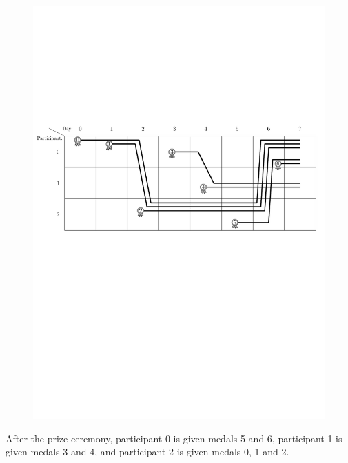 \begin{figure}
\begin{center}
  \includegraphics{sample_illustration}
\end{center}
\end{figure}

After the prize ceremony, participant 0 is given medals 5 and 6,
participant 1 is given medals 3 and 4, and participant 2 is given medals 0, 1 and 2.

